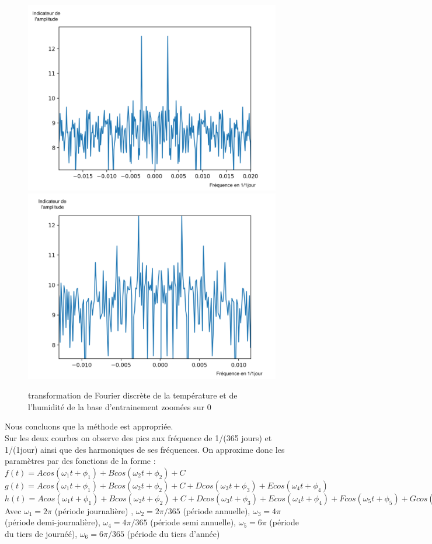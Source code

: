 \documentclass[11pt,a4paper]{article}
\begin{document}
\begin{figure} [!h]
\centering
\includegraphics[width=0.48 \textwidth]{./imagesTIPE/fftTZ.png}\quad
\includegraphics[width=0.48 \textwidth]{./imagesTIPE/fftHZ.png}
\caption{\label{fig:190101Lolita} transformation de Fourier discrète de la température et de l'humidité de la base d'entrainement zoomées sur 0 }
\end{figure}

Nous concluons que la méthode est appropriée. \\
Sur les deux courbes on observe des pics aux fréquence de 1/(365 jours) et 1/(1jour) ainsi que des harmoniques de ses fréquences.
On approxime donc les paramètres par des fonctions de la forme : \\
 $f(t) = A cos (\omega_{1} t + \phi_{1}) + B cos (\omega_{2} t + \phi_{2}) + C$  \\
$g(t) = A cos (\omega_{1} t + \phi_{1}) + B cos (\omega_{2} t + \phi_{2}) + C + D cos (\omega_{3} t + \phi_{3}) + E cos (\omega_{4} t + \phi_{4})$ \\
$h(t) = A cos (\omega_{1} t + \phi_{1}) + B cos (\omega_{2} t + \phi_{2}) + C + D cos (\omega_{3} t + \phi_{3}) + E cos (\omega_{4} t + \phi_{4}) + F cos (\omega_{5} t + \phi_{5}) + G cos (\omega_{6} t + \phi_{6})$ \\ 
Avec $\omega_{1} = 2 \pi$ (période journalière) , $\omega_{2} = 2 \pi /365$ (période annuelle), $\omega_{3} = 4 \pi$ (période demi-journalière), $\omega_{4} = 4\pi/365 $  (période semi annuelle), $\omega_{5} = 6 \pi$ (période du tiers de journéé), $\omega_{6} = 6\pi/365 $  (période du tiers d'année)\\
\end{document}
